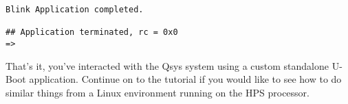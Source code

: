 \begin{flushleft}
\begin{enumerate}[
	label=\textbf{Step \arabic*.},
	leftmargin=*,
	widest={00},
	align=left]
\begin{verbatim}
Blink Application completed.

## Application terminated, rc = 0x0
=>

\end{verbatim}

\end{enumerate}

That's it, you've interacted with the Qsys system using a custom standalone U-Boot application.  Continue on to the  tutorial if you would like to see how to do similar things from a Linux environment running on the HPS processor.

\end{flushleft}



